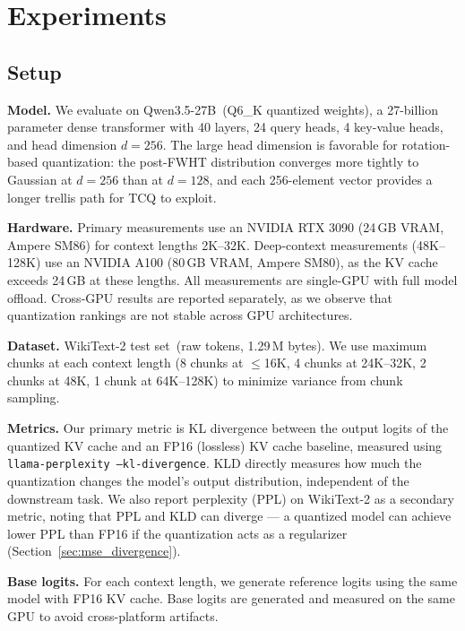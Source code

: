 \documentclass{article}
\begin{document}
\section{Experiments}
\label{sec:results}

\subsection{Setup}
\label{sec:exp_setup}

\textbf{Model.} We evaluate on Qwen3.5-27B~(Q6\_K quantized weights), a
27-billion parameter dense transformer with 40 layers, 24 query heads, 4
key-value heads, and head dimension $d = 256$. The large head dimension is
favorable for rotation-based quantization: the post-FWHT distribution converges
more tightly to Gaussian at $d = 256$ than at $d = 128$, and each 256-element
vector provides a longer trellis path for TCQ to exploit.

\textbf{Hardware.} Primary measurements use an NVIDIA RTX 3090 (24\,GB VRAM,
Ampere SM86) for context lengths 2K--32K. Deep-context measurements (48K--128K)
use an NVIDIA A100 (80\,GB VRAM, Ampere SM80), as the KV cache exceeds 24\,GB
at these lengths. All measurements are single-GPU with full model offload.
Cross-GPU results are reported separately, as we observe that quantization
rankings are not stable across GPU architectures.

\textbf{Dataset.} WikiText-2 test set~(raw tokens, 1.29\,M bytes). We use
maximum chunks at each context length (8 chunks at $\leq$16K, 4 chunks at
24K--32K, 2 chunks at 48K, 1 chunk at 64K--128K) to minimize variance from
chunk sampling.

\textbf{Metrics.} Our primary metric is KL divergence between the output
logits of the quantized KV cache and an FP16 (lossless) KV cache baseline,
measured using \texttt{llama-perplexity --kl-divergence}. KLD directly measures
how much the quantization changes the model's output distribution, independent
of the downstream task. We also report perplexity (PPL) on WikiText-2 as a
secondary metric, noting that PPL and KLD can diverge --- a quantized model can
achieve lower PPL than FP16 if the quantization acts as a regularizer
(Section~\ref{sec:mse_divergence}).

\textbf{Base logits.} For each context length, we generate reference logits
using the same model with FP16 KV cache. Base logits are generated and measured
on the same GPU to avoid cross-platform artifacts.
\end{document}
